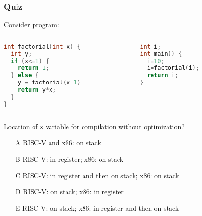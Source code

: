 \documentclass{beamer}
\begin{document}
\begin{frame}[fragile,shrink=10]
\frametitle{Quiz}

Consider program:
\begin{columns}
\begin{column}{0.45\textwidth}
\begin{lstlisting}[language={C},columns=flexible]
int factorial(int x) {
  int y;
  if (x<=1) {
    return 1;
  } else {
    y = factorial(x-1)
    return y*x;
  }
}
\end{lstlisting}
\end{column}
\hfill
\begin{column}{0.45\textwidth}  
\begin{lstlisting}[language={C},columns=flexible]
int i;
int main() {
  i=10;
  i=factorial(i);
  return i;
}
\end{lstlisting}
\end{column}
\end{columns}

Location of \texttt{x} variable for compilation without optimization?
\begin{itemize}
\item[A] RISC-V and x86: on stack
\item[B] RISC-V: in register; x86: on stack
\item[C] RISC-V: in register and then on stack; x86: on stack
\item[D] RISC-V: on stack; x86: in register
\item[E] RISC-V: on stack; x86: in register and then on stack
\end{itemize}
\end{frame}
\end{document}
